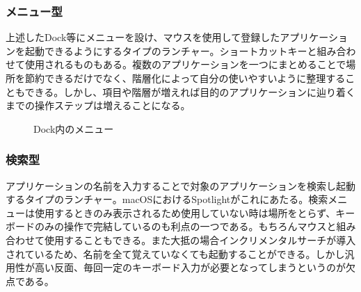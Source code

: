 \subsubsection{メニュー型}

上述したDock等にメニューを設け、マウスを使用して登録したアプリケーションを起動できるようにするタイプのランチャー。ショートカットキーと組み合わせて使用されるものもある。複数のアプリケーションを一つにまとめることで場所を節約できるだけでなく、階層化によって自分の使いやすいように整理することもできる。しかし、項目や階層が増えれば目的のアプリケーションに辿り着くまでの操作ステップは増えることになる。

\newpage

\begin{figure}[h]
    \begin{center}
    \end{center}
    \caption{Dock内のメニュー}
    \label{fig:menu}
\end{figure}

\subsubsection{検索型}

アプリケーションの名前を入力することで対象のアプリケーションを検索し起動するタイプのランチャー。macOSにおけるSpotlightがこれにあたる。検索メニューは使用するときのみ表示されるため使用していない時は場所をとらず、キーボードのみの操作で完結しているのも利点の一つである。もちろんマウスと組み合わせて使用することもできる。また大抵の場合インクリメンタルサーチが導入されているため、名前を全て覚えていなくても起動することができる。しかし汎用性が高い反面、毎回一定のキーボード入力が必要となってしまうというのが欠点である。

